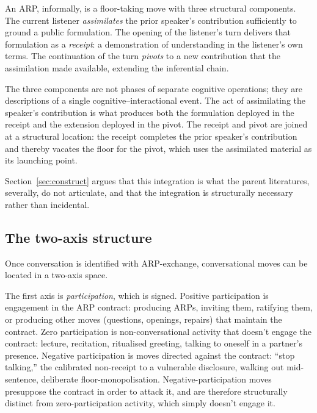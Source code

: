 An ARP, informally, is a floor-taking move with three structural components. The current listener \emph{assimilates} the prior speaker's contribution sufficiently to ground a public formulation. The opening of the listener's turn delivers that formulation as a \emph{receipt}: a demonstration of understanding in the listener's own terms. The continuation of the turn \emph{pivots} to a new contribution that the assimilation made available, extending the inferential chain.

The three components are not phases of separate cognitive operations; they are descriptions of a single cognitive--interactional event. The act of assimilating the speaker's contribution is what produces both the formulation deployed in the receipt and the extension deployed in the pivot. The receipt and pivot are joined at a structural location: the receipt completes the prior speaker's contribution and thereby vacates the floor for the pivot, which uses the assimilated material as its launching point.

Section~\ref{sec:construct} argues that this integration is what the parent literatures, severally, do not articulate, and that the integration is structurally necessary rather than incidental.

\subsection{The two-axis structure}

Once conversation is identified with ARP-exchange, conversational moves can be located in a two-axis space.

The first axis is \emph{participation}, which is signed. Positive participation is engagement in the ARP contract: producing ARPs, inviting them, ratifying them, or producing other moves (questions, openings, repairs) that maintain the contract. Zero participation is non-conversational activity that doesn't engage the contract: lecture, recitation, ritualised greeting, talking to oneself in a partner's presence. Negative participation is moves directed against the contract: ``stop talking,'' the calibrated non-receipt to a vulnerable disclosure, walking out mid-sentence, deliberate floor-monopolisation. Negative-participation moves presuppose the contract in order to attack it, and are therefore structurally distinct from zero-participation activity, which simply doesn't engage it.

